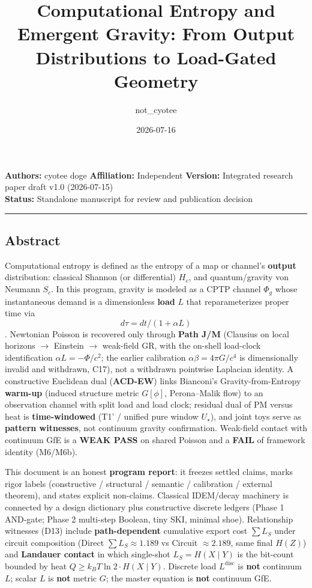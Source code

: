 \documentclass[
  11pt,
]{article}
\title{Computational Entropy and Emergent Gravity: From Output
Distributions to Load-Gated Geometry}
\author{not\_cyotee}
\date{2026-07-16}
\begin{document}
\maketitle

{
\setcounter{tocdepth}{2}
\tableofcontents
}
\textbf{Authors:} cyotee doge \textbf{Affiliation:} Independent
\textbf{Version:} Integrated research paper draft v1.0 (2026-07-15)\\
\textbf{Status:} Standalone manuscript for review and publication
decision

\begin{center}\rule{0.5\linewidth}{0.5pt}\end{center}

\subsection{Abstract}\label{abstract}

Computational entropy is defined as the entropy of a map or channel's
\textbf{output} distribution: classical Shannon (or differential)
\(H_c\), and quantum/gravity von Neumann \(S_c\). In this program,
gravity is modeled as a CPTP channel \(\Phi_g\) whose instantaneous
demand is a dimensionless \textbf{load} \(L\) that reparameterizes
proper time via \[d\tau=dt/(1+\alpha L)\]. Newtonian Poisson is
recovered only through \textbf{Path J/M} (Clausius on local horizons $\to$
Einstein $\to$ weak-field GR, with the on-shell load-clock identification
\(\alpha L=-\Phi/c^2\); the earlier calibration \(\alpha\beta=4\pi G/c^4\)
is dimensionally invalid and withdrawn, C17), not a withdrawn pointwise Laplacian
identity. A constructive Euclidean dual (\textbf{ACD-EW}) links
Bianconi's Gravity-from-Entropy \textbf{warm-up} (induced structure
metric \(G[\phi]\), Perona--Malik flow) to an observation channel with
split load and load clock; residual dual of PM versus heat is
\textbf{time-windowed} (T1' / unified pure window \(U_\star\)), and
joint toys serve as \textbf{pattern witnesses}, not continuum gravity
confirmation. Weak-field contact with continuum GfE is a \textbf{WEAK
PASS} on shared Poisson and a \textbf{FAIL} of framework identity
(M6/M6b).

This document is an honest \textbf{program report}: it freezes settled
claims, marks rigor labels (constructive / structural / semantic /
calibration / external theorem), and states explicit non-claims.
Classical IDEM/decay machinery is connected by a design dictionary plus
constructive discrete ledgers (Phase 1 AND-gate; Phase 2 multi-step
Boolean, tiny SKI, minimal shoe). Relationship witnesses (D13) include
\textbf{path-dependent} cumulative export cost \(\sum L_S\) under
circuit composition (Direct \(\sum L_S\approx 1.189\) vs Circuit
\(\approx 2.189\), same final \(H(Z)\)) and \textbf{Landauer contact} in
which single-shot \(L_S=H(X\mid Y)\) is the bit-count bounded by heat
\(Q\ge k_B T\ln 2\cdot H(X\mid Y)\). Discrete load \(L^{\mathrm{disc}}\)
is \textbf{not} continuum \(L\); scalar \(L\) is \textbf{not} metric
\(G\); the master equation is \textbf{not} continuum GfE.
\end{document}
